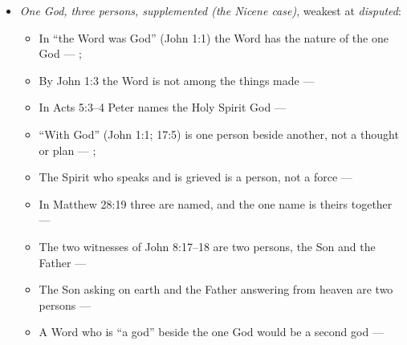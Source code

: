 \documentclass[11pt,paper=\testimonypaper,DIV=13,parskip=false]{scrartcl}
\begin{document}
\begin{itemize}
\item \emph{One God, three persons, supplemented (the Nicene case)}, weakest at \emph{disputed}:
\begin{itemize}
\item In “the Word was God” (John 1:1) the Word has the nature of the one God --- \cite{harner-qualitative-anarthrous-1973}; \cite[3, The Triune God]{kibbey-living-systematic-theology-2026}
\item By John 1:3 the Word is not among the things made --- \cite[Tractates on John I.11]{schaff-nicene-post-nicene-fathers-1-7}
\item In Acts 5:3–4 Peter names the Holy Spirit God --- \cite[198]{calvin-commentary-acts-1844}
\item “With God” (John 1:1; 17:5) is one person beside another, not a thought or plan --- \cite[3, The Triune God]{kibbey-living-systematic-theology-2026}; \cite[27]{watchtower-should-you-believe-trinity-1989}
\item The Spirit who speaks and is grieved is a person, not a force --- \cite[3, The Triune God]{kibbey-living-systematic-theology-2026}
\item In Matthew 28:19 three are named, and the one name is theirs together --- \cite[3, The Triune God]{kibbey-living-systematic-theology-2026}
\item The two witnesses of John 8:17–18 are two persons, the Son and the Father --- \cite[Against Praxeas 22]{roberts-ante-nicene-fathers-3-1885}
\item The Son asking on earth and the Father answering from heaven are two persons --- \cite[Against Praxeas 23]{roberts-ante-nicene-fathers-3-1885}
\item A Word who is “a god” beside the one God would be a second god --- \cite[75]{metzger-jehovahs-witnesses-jesus-christ-1953}

\end{itemize}
\end{itemize}
\end{document}
